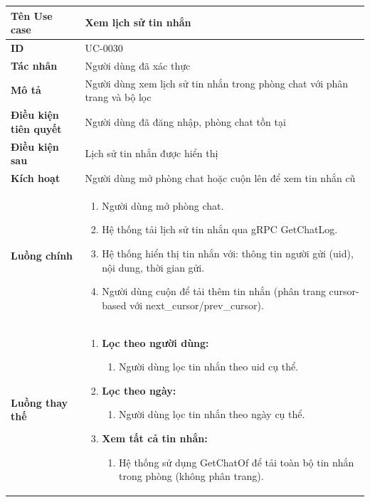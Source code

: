 {
\renewcommand{\arraystretch}{1.5}

\begin{tabularx}{\textwidth}{|>{\raggedright\arraybackslash}X|>{\raggedright\arraybackslash}X|}
\hline
\textbf{Tên Use case} & Xem lịch sử tin nhắn \\
\hline
\textbf{ID} & UC-0030 \\
\hline
\textbf{Tác nhân} & Người dùng đã xác thực \\
\hline
\textbf{Mô tả} & Người dùng xem lịch sử tin nhắn trong phòng chat với phân trang và bộ lọc \\
\hline
\textbf{Điều kiện tiên quyết} & Người dùng đã đăng nhập, phòng chat tồn tại \\
\hline
\textbf{Điều kiện sau} & Lịch sử tin nhắn được hiển thị \\
\hline
\textbf{Kích hoạt} & Người dùng mở phòng chat hoặc cuộn lên để xem tin nhắn cũ \\
\hline
\textbf{Luồng chính} &
\begin{enumerate}
    \item Người dùng mở phòng chat.
    \item Hệ thống tải lịch sử tin nhắn qua gRPC GetChatLog.
    \item Hệ thống hiển thị tin nhắn với: thông tin người gửi (uid), nội dung, thời gian gửi.
    \item Người dùng cuộn để tải thêm tin nhắn (phân trang cursor-based với next\_cursor/prev\_cursor).
\end{enumerate} \\
\hline
\textbf{Luồng thay thế} &
\begin{enumerate}
    \item \textbf{Lọc theo người dùng:}
    \begin{enumerate}
        \item[2A.] Người dùng lọc tin nhắn theo uid cụ thể.
    \end{enumerate}
    \item \textbf{Lọc theo ngày:}
    \begin{enumerate}
        \item[2B.] Người dùng lọc tin nhắn theo ngày cụ thể.
    \end{enumerate}
    \item \textbf{Xem tất cả tin nhắn:}
    \begin{enumerate}
        \item[2C.] Hệ thống sử dụng GetChatOf để tải toàn bộ tin nhắn trong phòng (không phân trang).

\end{enumerate}
\end{enumerate}
\end{tabularx}}
